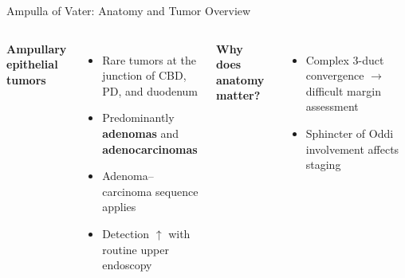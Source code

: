 \documentclass[aspectratio=169,10pt]{beamer}
\begin{document}
\begin{frame}{Ampulla of Vater: Anatomy and Tumor Overview}
\begin{columns}[T]
\textbf{Ampullary epithelial tumors}
\begin{itemize}
  \item Rare tumors at the junction of CBD, PD, and duodenum
  \item Predominantly \textbf{adenomas} and \textbf{adenocarcinomas}
  \item Adenoma--carcinoma sequence applies
  \item Detection $\uparrow$ with routine upper endoscopy
\end{itemize}

\vspace{6pt}
\textbf{Why does anatomy matter?}
\begin{itemize}
  \item Complex 3-duct convergence $\to$ difficult margin assessment
  \item Sphincter of Oddi involvement affects staging
\end{itemize}
\end{columns}
\end{frame}
\end{document}
